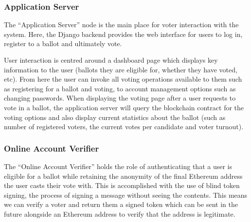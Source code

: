 \documentclass{article}
\begin{document}
\subsubsection{Application Server}
The ``Application Server'' node is the main place for voter interaction with the system. Here, the Django backend provides the web interface for users to log in, register to a ballot and ultimately vote.

User interaction is centred around a dashboard page which displays key information to the user (ballots they are eligible for, whether they have voted, etc). From here the user can invoke all voting operations available to them such as registering for a ballot and voting, to account management options such as changing passwords. When displaying the voting page after a user requests to vote in a ballot, the application server will query the blockchain contract for the voting options and also display current statistics about the ballot (such as number of registered voters, the current votes per candidate and voter turnout).

\subsubsection{Online Account Verifier}
The ``Online Account Verifier'' holds the role of authenticating that a user is eligible for a ballot while retaining the anonymity of the final Ethereum address the user casts their vote with. This is accomplished with the use of blind token signing, the process of signing a message without seeing the contents. This means we can verify a voter and return them a signed token which can be sent in the future alongside an Ethereum address to verify that the address is legitimate. 
\end{document}
